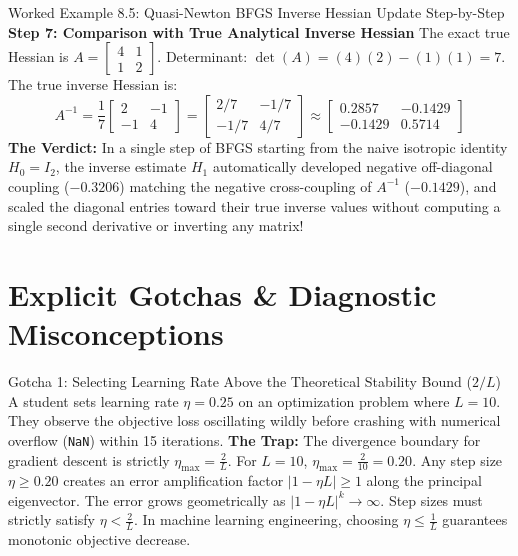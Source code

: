 \begin{examplebox}[breakable]{Worked Example 8.5: Quasi-Newton BFGS Inverse Hessian Update Step-by-Step}
\textbf{Step 7: Comparison with True Analytical Inverse Hessian}
The exact true Hessian is $A = \begin{bmatrix} 4 & 1 \\ 1 & 2 \end{bmatrix}$. Determinant: $\det(A) = (4)(2) - (1)(1) = 7$.
The true inverse Hessian is:
\begin{equation*}
A^{-1} = \frac{1}{7} \begin{bmatrix} 2 & -1 \\ -1 & 4 \end{bmatrix} = \begin{bmatrix} 2/7 & -1/7 \\ -1/7 & 4/7 \end{bmatrix} \approx \mathbf{\begin{bmatrix} 0.2857 & -0.1429 \\ -0.1429 & 0.5714 \end{bmatrix}}
\end{equation*}
\textbf{The Verdict:} In a single step of BFGS starting from the naive isotropic identity $H_0 = I_2$, the inverse estimate $H_1$ automatically developed negative off-diagonal coupling ($-0.3206$) matching the negative cross-coupling of $A^{-1}$ ($-0.1429$), and scaled the diagonal entries toward their true inverse values without computing a single second derivative or inverting any matrix!
\end{examplebox}

\section{Explicit Gotchas \& Diagnostic Misconceptions}

\begin{trapbox}{Gotcha 1: Selecting Learning Rate Above the Theoretical Stability Bound ($2/L$)}
A student sets learning rate $\eta = 0.25$ on an optimization problem where $L = 10$. They observe the objective loss oscillating wildly before crashing with numerical overflow (\texttt{NaN}) within 15 iterations.
\tcblower
\textbf{The Trap:} The divergence boundary for gradient descent is strictly $\eta_{\max} = \frac{2}{L}$. For $L = 10$, $\eta_{\max} = \frac{2}{10} = 0.20$. Any step size $\eta \ge 0.20$ creates an error amplification factor $|1 - \eta L| \ge 1$ along the principal eigenvector. The error grows geometrically as $|1 - \eta L|^k \to \infty$. Step sizes must strictly satisfy $\eta < \frac{2}{L}$. In machine learning engineering, choosing $\eta \le \frac{1}{L}$ guarantees monotonic objective decrease.
\end{trapbox}

